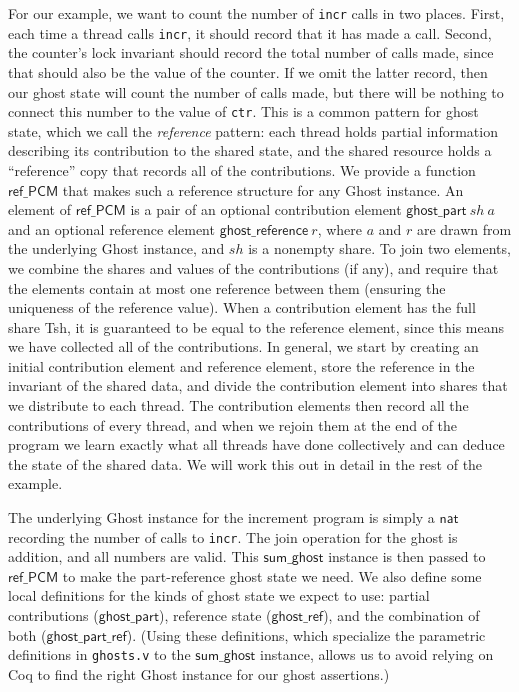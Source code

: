\documentclass[11pt]{article}
\begin{document}
For our example, we want to count the number of \texttt{incr} calls in two places. First, each time a thread calls \texttt{incr}, it should record that it has made a call. Second, the counter's lock invariant should record the total number of calls made, since that should also be the value of the counter. If we omit the latter record, then our ghost state will count the number of calls made, but there will be nothing to connect this number to the value of \texttt{ctr}. This is a common pattern for ghost state, which we call the \emph{reference} pattern: each thread holds partial information describing its contribution to the shared state, and the shared resource holds a ``reference'' copy that records all of the contributions. We provide a function $\mathsf{ref\_PCM}$ that makes such a reference structure for any \textsf{Ghost} instance. An element of $\mathsf{ref\_PCM}$ is a pair of an optional contribution element $\mathsf{ghost\_part}\ \mathit{sh}\ a$ and an optional reference element $\mathsf{ghost\_reference}\ r$, where $a$ and $r$ are drawn from the underlying \textsf{Ghost} instance, and $\mathit{sh}$ is a nonempty share. To join two elements, we combine the shares and values of the contributions (if any), and require that the elements contain at most one reference between them (ensuring the uniqueness of the reference value). When a contribution element has the full share \textsf{Tsh}, it is guaranteed to be equal to the reference element, since this means we have collected all of the contributions. In general, we start by creating an initial contribution element and reference element, store the reference in the invariant of the shared data, and divide the contribution element into shares that we distribute to each thread. The contribution elements then record all the contributions of every thread, and when we rejoin them at the end of the program we learn exactly what all threads have done collectively and can deduce the state of the shared data. We will work this out in detail in the rest of the example.

The underlying \textsf{Ghost} instance for the increment program is simply a $\mathsf{nat}$ recording the number of calls to \texttt{incr}. The join operation for the ghost is addition, and all numbers are valid. This $\mathsf{sum\_ghost}$ instance is then passed to $\mathsf{ref\_PCM}$ to make the part-reference ghost state we need. We also define some local definitions for the kinds of ghost state we expect to use: partial contributions ($\mathsf{ghost\_part}$), reference state ($\mathsf{ghost\_ref}$), and the combination of both ($\mathsf{ghost\_part\_ref}$). (Using these definitions, which specialize the parametric definitions in \texttt{ghosts.v} to the $\mathsf{sum\_ghost}$ instance, allows us to avoid relying on Coq to find the right \textsf{Ghost} instance for our ghost assertions.)
\end{document}

